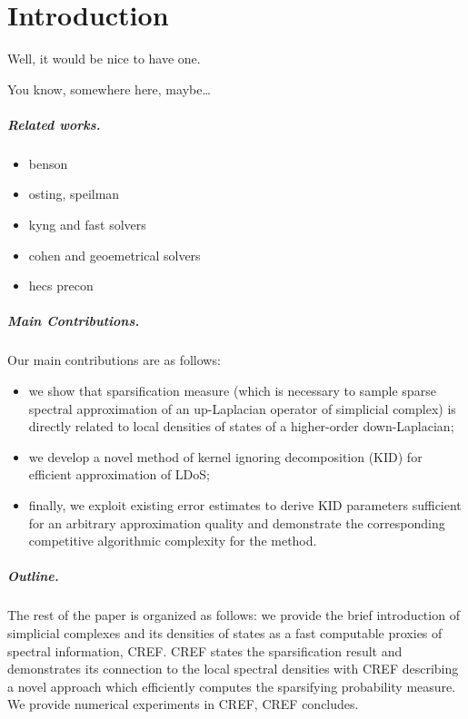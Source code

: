 \chapter{Introduction}

Well, it would be nice to have one. 

You know, somewhere here, maybe\dots

\paragraph*{ Related works. }
 

\begin{itemize}
      \item benson
      \item osting, speilman
      \item kyng and fast solvers
      \item cohen and geoemetrical solvers
      \item hecs precon 
\end{itemize}


\paragraph*{ Main Contributions. } Our main contributions are as follows:
\begin{itemize}
      \item we show that sparsification measure (which is necessary to sample sparse spectral approximation of an up-Laplacian operator of simplicial complex) is directly related to local densities of states of a higher-order down-Laplacian;
      \item we develop a novel method of kernel ignoring decomposition (KID) for efficient approximation of LDoS;
      \item finally, we exploit existing error estimates to derive KID parameters sufficient for an arbitrary approximation quality and demonstrate the corresponding competitive algorithmic complexity for the method.
\end{itemize}

\paragraph*{ Outline. } The rest of the paper is organized as follows: we provide the brief introduction of simplicial complexes and its densities of states as a fast computable proxies of spectral information, CREF. CREF states the sparsification result and demonstrates its connection to the local spectral densities with CREF describing a novel approach which efficiently computes the sparsifying probability measure. We provide numerical experiments in CREF, CREF concludes.